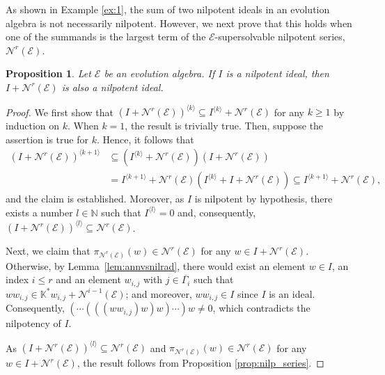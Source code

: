 \documentclass[12pt,reqno]{amsart}
\newtheorem{proposition}[theorem]{Proposition}
\theoremstyle{definition}
\theoremstyle{remark}
\numberwithin{equation}{section}
\begin{document}
As shown in Example \ref{ex:1}, the sum of two nilpotent ideals in an evolution algebra is not necessarily nilpotent. However, we next prove that this holds when one of the summands is the largest term of the $\mathcal{E}$-supersolvable nilpotent series, $\mathcal{N}^r(\mathcal{E})$.

\begin{proposition}\label{prop:sumsnil}
	Let $\mathcal{E}$ be an evolution algebra. If $I$ is a nilpotent ideal, then $I+\mathcal{N}^r(\mathcal{E})$ is also a nilpotent ideal.
\end{proposition}
\begin{proof}
	We first show that $(I+\mathcal{N}^r(\mathcal{E}))^{\langle k\rangle}\subseteq I^{\langle k\rangle}+\mathcal{N}^r(\mathcal{E})$ for any $k\geq1$ by induction on $k$. When $k=1$, the result is trivially true. Then, suppose the assertion is true for $k$. Hence, it follows that 
	\begin{align*}
		(I+\mathcal{N}^r(\mathcal{E}))^{\langle k+1\rangle}&\subseteq(I^{\langle k\rangle}+\mathcal{N}^r(\mathcal{E}))(I+\mathcal{N}^r(\mathcal{E}))\\
		&=I^{\langle k+1\rangle}+\mathcal{N}^r(\mathcal{E})(I^{\langle k\rangle}+I+\mathcal{N}^r(\mathcal{E}))\subseteq I^{\langle k+1\rangle}+\mathcal{N}^r(\mathcal{E}),
	\end{align*}
	and the claim is established. Moreover, as $I$ is nilpotent by hypothesis, there exists a number $l\in\mathbb{N}$ such that $I^{\langle l \rangle}=0$ and, consequently, $(I+\mathcal{N}^r(\mathcal{E}))^{\langle l\rangle}\subseteq\mathcal{N}^r(\mathcal{E})$.
	
	Next, we claim that $\pi_{\mathcal{N}^r(\mathcal{E})}(w)\in\mathcal{N}^r(\mathcal{E})$ for any $w\in I+\mathcal{N}^r(\mathcal{E})$. Otherwise, by Lemma~\ref{lem:annvsnilrad}, there would exist an element $w\in I$, an index $i\leq r$ and an element $w_{i,j}$ with $j\in\overline{\varGamma_i}$ such that $ww_{i,j}\in\mathbb{K}^*w_{i,j}+\mathcal{N}^{i-1}(\mathcal{E})$; and moreover, $ww_{i,j}\in I$ since $I$ is an ideal. Consequently, $(\cdots(((ww_{i,j})w)w)\cdots)w\neq0$, which contradicts the nilpotency of $I$.
	
	As $(I+\mathcal{N}^r(\mathcal{E}))^{\langle l\rangle}\subseteq\mathcal{N}^r(\mathcal{E})$ and $\pi_{\mathcal{N}^r(\mathcal{E})}(w)\in\mathcal{N}^r(\mathcal{E})$ for any $w\in I+\mathcal{N}^r(\mathcal{E})$, the result follows from Proposition \ref{prop:nilp_series}.
\end{proof}
\end{document}
